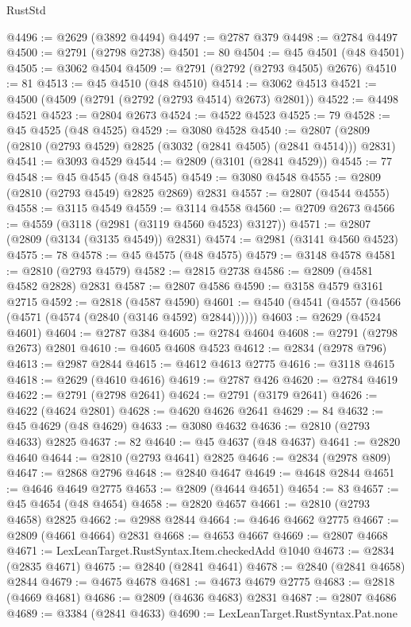 \begin{lexlean}{RustStd}
\begin{coremodule}
@4496 := @2629 (@3892 @4494)
@4497 := @2787 @379
@4498 := @2784 @4497
@4500 := @2791 (@2798 @2738)
@4501 := 80
@4504 := @45 @4501 (@48 @4501)
@4505 := @3062 @4504
@4509 := @2791 (@2792 (@2793 @4505) @2676)
@4510 := 81
@4513 := @45 @4510 (@48 @4510)
@4514 := @3062 @4513
@4521 := @4500 (@4509 (@2791 (@2792 (@2793 @4514) @2673) @2801))
@4522 := @4498 @4521
@4523 := @2804 @2673
@4524 := @4522 @4523
@4525 := 79
@4528 := @45 @4525 (@48 @4525)
@4529 := @3080 @4528
@4540 := @2807 (@2809 (@2810 (@2793 @4529) @2825 (@3032 (@2841 @4505) (@2841 @4514))) @2831)
@4541 := @3093 @4529
@4544 := @2809 (@3101 (@2841 @4529))
@4545 := 77
@4548 := @45 @4545 (@48 @4545)
@4549 := @3080 @4548
@4555 := @2809 (@2810 (@2793 @4549) @2825 @2869) @2831
@4557 := @2807 (@4544 @4555)
@4558 := @3115 @4549
@4559 := @3114 @4558
@4560 := @2709 @2673
@4566 := @4559 (@3118 (@2981 (@3119 @4560 @4523) @3127))
@4571 := @2807 (@2809 (@3134 (@3135 @4549)) @2831)
@4574 := @2981 (@3141 @4560 @4523)
@4575 := 78
@4578 := @45 @4575 (@48 @4575)
@4579 := @3148 @4578
@4581 := @2810 (@2793 @4579)
@4582 := @2815 @2738
@4586 := @2809 (@4581 @4582 @2828) @2831
@4587 := @2807 @4586
@4590 := @3158 @4579 @3161 @2715
@4592 := @2818 (@4587 @4590)
@4601 := @4540 (@4541 (@4557 (@4566 (@4571 (@4574 (@2840 (@3146 @4592) @2844))))))
@4603 := @2629 (@4524 @4601)
@4604 := @2787 @384
@4605 := @2784 @4604
@4608 := @2791 (@2798 @2673) @2801
@4610 := @4605 @4608 @4523
@4612 := @2834 (@2978 @796)
@4613 := @2987 @2844
@4615 := @4612 @4613 @2775
@4616 := @3118 @4615
@4618 := @2629 (@4610 @4616)
@4619 := @2787 @426
@4620 := @2784 @4619
@4622 := @2791 (@2798 @2641)
@4624 := @2791 (@3179 @2641)
@4626 := @4622 (@4624 @2801)
@4628 := @4620 @4626 @2641
@4629 := 84
@4632 := @45 @4629 (@48 @4629)
@4633 := @3080 @4632
@4636 := @2810 (@2793 @4633) @2825
@4637 := 82
@4640 := @45 @4637 (@48 @4637)
@4641 := @2820 @4640
@4644 := @2810 (@2793 @4641) @2825
@4646 := @2834 (@2978 @809)
@4647 := @2868 @2796
@4648 := @2840 @4647
@4649 := @4648 @2844
@4651 := @4646 @4649 @2775
@4653 := @2809 (@4644 @4651)
@4654 := 83
@4657 := @45 @4654 (@48 @4654)
@4658 := @2820 @4657
@4661 := @2810 (@2793 @4658) @2825
@4662 := @2988 @2844
@4664 := @4646 @4662 @2775
@4667 := @2809 (@4661 @4664) @2831
@4668 := @4653 @4667
@4669 := @2807 @4668
@4671 := LexLeanTarget.RustSyntax.Item.checkedAdd @1040
@4673 := @2834 (@2835 @4671)
@4675 := @2840 (@2841 @4641)
@4678 := @2840 (@2841 @4658) @2844
@4679 := @4675 @4678
@4681 := @4673 @4679 @2775
@4683 := @2818 (@4669 @4681)
@4686 := @2809 (@4636 @4683) @2831
@4687 := @2807 @4686
@4689 := @3384 (@2841 @4633)
@4690 := LexLeanTarget.RustSyntax.Pat.none

\end{coremodule}
\end{lexlean}
